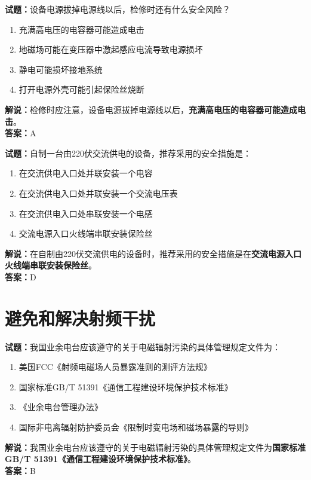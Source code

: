 \documentclass{ctexbook}
\begin{document}
\noindent\textbf{试题：}设备电源拔掉电源线以后，检修时还有什么安全风险？
\begin{enumerate}[leftmargin=3em]
	\item 充满高电压的电容器可能造成电击
	\item 地磁场可能在变压器中激起感应电流导致电源损坏
	\item 静电可能损坏接地系统
	\item 打开电源外壳可能引起保险丝烧断
\end{enumerate}
\noindent\textbf{解说：}检修时应注意，设备电源拔掉电源线以后，\textbf{充满高电压的电容器可能造成电击}。\\\noindent\textbf{答案：}A


\bigskip



\noindent\textbf{试题：}自制一台由220伏交流供电的设备，推荐采用的安全措施是：
\begin{enumerate}[leftmargin=3em]
	\item 在交流供电入口处并联安装一个电容
	\item 在交流供电入口处并联安装一个交流电压表
	\item 在交流供电入口处串联安装一个电感
	\item 交流电源入口火线端串联安装保险丝
\end{enumerate}
\noindent\textbf{解说：}在自制由220伏交流供电的设备时，推荐采用的安全措施是在\textbf{交流电源入口火线端串联安装保险丝}。\\\noindent\textbf{答案：}D





\chapter{避免和解决射频干扰}


\noindent\textbf{试题：}我国业余电台应该遵守的关于电磁辐射污染的具体管理规定文件为： 
\begin{enumerate}[leftmargin=3em]
\item 美国FCC《射频电磁场人员暴露准则的测评方法规》
\item 国家标准GB/T 51391《通信工程建设环境保护技术标准》
\item 《业余电台管理办法》
\item 国际非电离辐射防护委员会《限制时变电场和磁场暴露的导则》
\end{enumerate}
\noindent\textbf{解说：}我国业余电台应该遵守的关于电磁辐射污染的具体管理规定文件为\textbf{国家标准GB/T 51391《通信工程建设环境保护技术标准》}。\\\textbf{答案：}B
\end{document}

